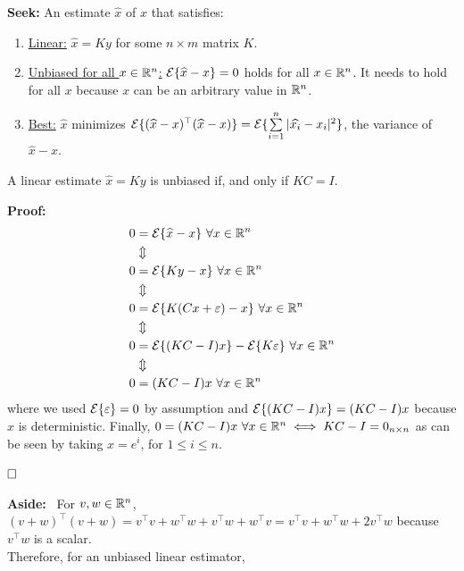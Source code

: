     \textbf{Seek:} An estimate $\widehat{x}$ of $x$ that satisfies:
    \begin{enumerate}
        \item \ul{Linear:} $\widehat{x}=Ky$ for some $n \times m$ matrix $K$.
        \item \ul{Unbiased for all $x\in \mathbb R^n$:} $\mathcal{E}\{ \widehat{x} - x \} =0 $ holds for all $x\in \mathbb R^n$. It needs to hold for all $x$ because $x$ can be an arbitrary value in $\mathbb R^n$.
        \item \ul{Best:} $\widehat{x}$ minimizes  $\mathcal{E}\{(\widehat{x} - x)^\top (\widehat{x} -x)\}=\mathcal{E}\{ \sum \limits_{i=1}^n |\widehat{x_i}-x_i|^2\} $, the variance of $\widehat{x} - x$.
    \end{enumerate}
    
\begin{claim} A linear estimate $\widehat{x}=Ky$ is unbiased if, and only if $KC=I$.
\end{claim}
\textbf{Proof:} 
\begin{align*}
    0 & = \mathcal{E}\{ \widehat{x} - x\} ~\forall x \in \mathbb R^n\\
    & \Updownarrow \\
     0 & = \mathcal{E}\{ Ky - x\}  ~\forall x \in \mathbb R^n\\
    & \Updownarrow \\
     0 & = \mathcal{E}\{ K(Cx+\varepsilon) - x\}  ~\forall x \in \mathbb R^n\\
    & \Updownarrow \\
        0 & = \mathcal{E}\{ (K C - I)x\} - \mathcal{E}\{K \varepsilon \}  ~\forall x \in \mathbb R^n \\
    & \Updownarrow \\
            0 & = (K C - I)x  ~\forall x \in \mathbb R^n\\
\end{align*}
where we used $\mathcal{E}\{\varepsilon\}=0$ by assumption and $ \mathcal{E}\{ (K C - I)x\}=(K C - I)x$ because $x$ is deterministic. Finally, $0=(K C - I)x  ~\forall x \in \mathbb R^n \iff KC-I =0_{n \times n}$ as can be seen by taking $x = e^i$, for $1 \le i \le n$.

$\hfill \square$


    \textbf{Aside:}~ For $v, w \in \mathbb R^n$, $ (v+w)^\top (v+w)=v^\top v+w^\top w+v^\top w+w^\top v =
        v^\top v+w^\top w+2v^\top w$ because $v^\top w $ is a scalar.\\
        
        Therefore, for an unbiased linear estimator,

